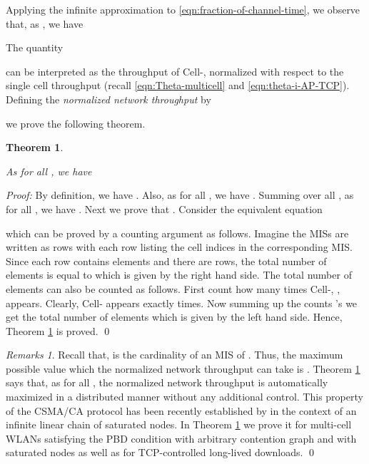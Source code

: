 \documentclass[10pt,a4paper,journal]{IEEEtran}
\theoremstyle{definition}
\theoremstyle{remark}
\newtheorem{remark}{Remarks}[section] \newtheorem{discussion}{Discussion}[section] \newtheorem{example}{Example}[section]
\theoremstyle{plain}
\newtheorem{theorem}{Theorem}[section]
\begin{document}
Applying the infinite  approximation to \eqref{eqn:fraction-of-channel-time}, we observe that, as , we have 
 
The quantity 
 
can be interpreted as the throughput of Cell-, normalized with respect to the single cell throughput (recall \eqref{eqn:Theta-multicell} and \eqref{eqn:theta-i-AP-TCP}). Defining the \textit{normalized network throughput}  by 
 
we prove the following theorem.


\begin{theorem}
\label{thm:maximum-throughput}

As  for all , we have 


\end{theorem}


\textit{Proof:} By definition, we have . Also, as  for all , we have . Summing over all , as  for all , we have . Next we prove that . Consider the equivalent equation 
 
which can be proved by a counting argument as follows. Imagine the  MISs are written as  rows with each row listing the cell indices in the corresponding MIS. Since each row contains  elements and there are  rows, the total number of elements is equal to  which is given by the right hand side. The total number of elements can also be counted as follows. First count how many times Cell-, , appears. Clearly, Cell- appears exactly  times. Now summing up the counts 's we get the total number of elements which is given by the left hand side. Hence, Theorem \ref{thm:maximum-throughput} is proved. \hfill \qed



\begin{remark}
\label{rmk:maximum-network-throughput}
Recall that,  is the cardinality of an MIS of . Thus, the maximum possible value which the normalized network throughput  can take is . Theorem \ref{thm:maximum-throughput} says that, as  for all , the normalized network throughput  is automatically maximized in a distributed manner without any additional control. This property of the CSMA/CA protocol has been recently established by \cite{wanet.durvy09selfOrganization} in the context of an infinite linear chain of saturated nodes. In Theorem \ref{thm:maximum-throughput} we prove it for multi-cell WLANs satisfying the PBD condition with arbitrary contention graph  and with saturated nodes as well as for TCP-controlled long-lived downloads. \hfill \qed
\end{remark}
\end{document}
